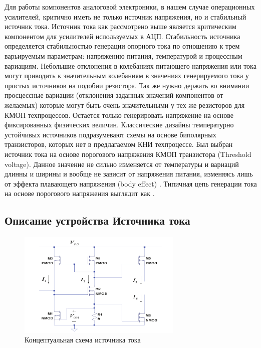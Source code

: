 \documentclass[a4paper,12pt]{article} %
\begin{document}
Для работы компонентов аналоговой электроники, в нашем случае операционных усилителей, критично иметь не только источник напряжения, но и стабильный источник тока. Источник тока как рассмотрено выше является критическим компонентом для усилителей используемых в АЦП. Стабильность источника определяется стабильностью генерации опорного тока по отношению к трем варьируемым параметрам: напряжению питания, температурой и процессным вариациям\cite{op_amp_comp10}. Небольшие отклонения в колебаниях питающего напряжения или тока могут приводить к значительным колебаниям в значениях генерируемого тока у простых источников на подобии резистора.  Так же нужно держать во внимании просцессные вариации (отклонения заданных  значений компонентов от желаемых) которые могут быть очень значительными у тех же резисторов для КМОП техпроцессов. Остается только генерировать напряжение на основе фиксированных физических величин. Классические дизайны температурно устойчивых источников подразумевают схемы на основе биполярных транзисторов, которых нет в предлагаемом КНИ техпроцессе. Был выбран источник тока на основе порогового напряжения КМОП транзистора (Threshold voltage)\cite{op_amp_comp11}. Данное значение не сильно изменяется от температуры и вариаций длинны и ширины и вообще не зависит от напряжения питания, изменяясь лишь от эффекта плавающего напряжения (body effect) \cite{op_amp_comp13}. Типичная цепь генерации тока на основе порогового напряжения выглядит как \cite{op_amp_comp10}.


\subsection{Описание устройства Источника тока }

\begin{figure}[H]
    \centering
    \includegraphics[width=0.7\textwidth]{current_source/design.png}
    \caption{Концептуальная схема источника тока}
    \label{pic:cs_pr}
\end{figure}
\end{document}
